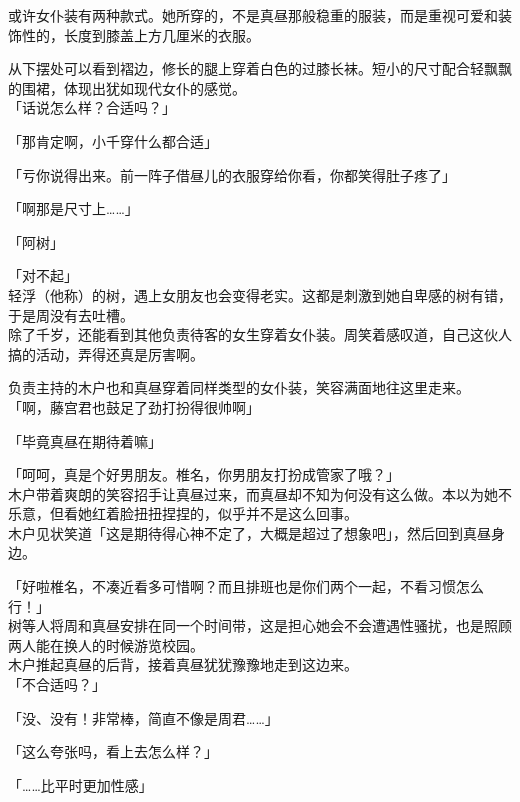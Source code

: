 或许女仆装有两种款式。她所穿的，不是真昼那般稳重的服装，而是重视可爱和装饰性的，长度到膝盖上方几厘米的衣服。

从下摆处可以看到褶边，修长的腿上穿着白色的过膝长袜。短小的尺寸配合轻飘飘的围裙，体现出犹如现代女仆的感觉。\\

「话说怎么样？合适吗？」

「那肯定啊，小千穿什么都合适」

「亏你说得出来。前一阵子借昼儿的衣服穿给你看，你都笑得肚子疼了」

「啊那是尺寸上……」

「阿树」

「对不起」\\

轻浮（他称）的树，遇上女朋友也会变得老实。这都是刺激到她自卑感的树有错，于是周没有去吐槽。\\

除了千岁，还能看到其他负责待客的女生穿着女仆装。周笑着感叹道，自己这伙人搞的活动，弄得还真是厉害啊。

负责主持的木户也和真昼穿着同样类型的女仆装，笑容满面地往这里走来。\\

「啊，藤宫君也鼓足了劲打扮得很帅啊」

「毕竟真昼在期待着嘛」

「呵呵，真是个好男朋友。椎名，你男朋友打扮成管家了哦？」\\

木户带着爽朗的笑容招手让真昼过来，而真昼却不知为何没有这么做。本以为她不乐意，但看她红着脸扭扭捏捏的，似乎并不是这么回事。\\

木户见状笑道「这是期待得心神不定了，大概是超过了想象吧」，然后回到真昼身边。

「好啦椎名，不凑近看多可惜啊？而且排班也是你们两个一起，不看习惯怎么行！」\\

树等人将周和真昼安排在同一个时间带，这是担心她会不会遭遇性骚扰，也是照顾两人能在换人的时候游览校园。\\

木户推起真昼的后背，接着真昼犹犹豫豫地走到这边来。\\

「不合适吗？」

「没、没有！非常棒，简直不像是周君……」

「这么夸张吗，看上去怎么样？」

「……比平时更加性感」

